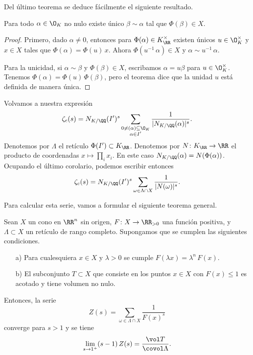 Del último teorema se deduce fácilmente el siguiente resultado.

\begin{corolario}
  Para todo $\alpha \in \O_K$ no nulo existe único $\beta \sim \alpha$ tal que
  $\Phi (\beta) \in X$.

  \begin{proof}
    Primero, dado $\alpha \ne 0$, entonces para $\Phi (\alpha) \in K_\RR^\times$
    existen únicos $u \in \O_K^\times$ y $x \in X$ tales que
    $\Phi (\alpha) = \Phi (u)\,x$. Ahora $\Phi (u^{-1}\,\alpha) \in X$ y
    $\alpha \sim u^{-1}\,\alpha$.

    Para la unicidad, si $\alpha \sim \beta$ y $\Phi (\beta) \in X$, escribamos
    $\alpha = u\beta$ para $u \in \O_K^\times$. Tenemos
    $\Phi (\alpha) = \Phi (u)\,\Phi (\beta)$, pero el teorema dice que la unidad
    $u$ está definida de manera única.
  \end{proof}
\end{corolario}

Volvamos a nuestra expresión
$$\zeta_c (s) = N_{K/\QQ} (I')^s \sum_{\substack{0 \ne (\alpha) \subseteq \O_K \\ \alpha \in I'}} \frac{1}{|N_{K/\QQ} (\alpha)|^s}.$$
Denotemos por $\Lambda$ el retículo $\Phi (I') \subset K_\RR$. Denotemos por
$N\colon K_\RR \to \RR$ el producto de coordenadas $x \mapsto \prod_i x_i$.
En este caso $N_{K/\QQ} (\alpha) = N (\Phi (\alpha))$. Ocupando el último
corolario, podemos escribir entonces
$$\zeta_c (s) = N_{K/\QQ} (I')^s \sum_{\omega \in \Lambda \cap X} \frac{1}{|N (\omega)|^s}.$$

Para calcular esta serie, vamos a formular el siguiente teorema general.

\begin{teorema}
  \label{thm:residuo-de-Z(s)}
  Sean $X$ un cono en $\RR^n$ sin origen, $F\colon X\to \RR_{>0}$ una función
  positiva, y $\Lambda \subset X$ un retículo de rango completo. Supongamos que
  se cumplen las siguientes condiciones.
  \begin{enumerate}
  \item[a)] Para cualesquiera $x \in X$ y $\lambda > 0$ se cumple
    $F (\lambda x) = \lambda^n\,F (x)$.

  \item[b)] El subconjunto $T \subset X$ que consiste en los puntos $x \in X$
    con $F (x) \le 1$ es acotado y tiene volumen no nulo.
  \end{enumerate}
  Entonces, la serie
  $$Z (s) = \sum_{\omega \in \Lambda \cap X} \frac{1}{F (x)^s}$$
  converge para $s > 1$ y se tiene
  $$\lim_{s \to 1^+} (s-1)\,Z (s) = \frac{\vol T}{\covol \Lambda}.$$
\end{teorema}

